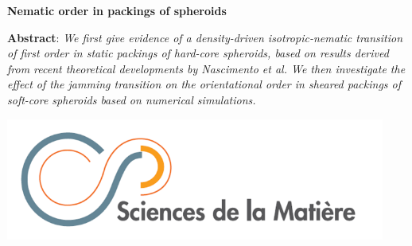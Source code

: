 \documentclass[class=report, float=false, crop=false]{standalone}
\begin{document}
\begin{center}



\vspace{1.5cm}

\textbf{\huge Nematic order in packings of spheroids}



\vspace{2cm}

\parbox{12cm}{\small
\textbf{Abstract}: \it We first give evidence of a density-driven isotropic-nematic transition of first order in static packings of hard-core spheroids, based on results derived from recent theoretical developments by Nascimento et al. We then investigate the effect of the jamming transition on the orientational order in sheared packings of soft-core spheroids based on numerical simulations.
} %


\vspace{0.5cm}


\vspace{5cm}

\includegraphics[height=4cm]{SdM.png}

\end{center}

\vfill
\newpage
\end{document}
